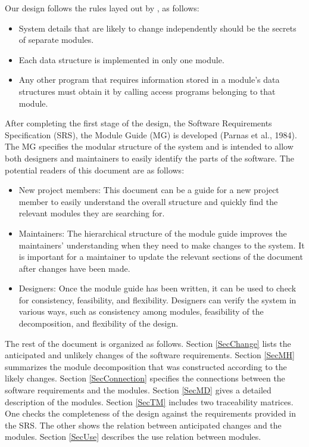 \documentclass[12pt, titlepage]{article}
\begin{document}
Our design follows the rules layed out by \citet{ParnasEtAl1984}, as follows:
\begin{itemize}
\item System details that are likely to change independently should be the
  secrets of separate modules.
\item Each data structure is implemented in only one module.
\item Any other program that requires information stored in a module's data
  structures must obtain it by calling access programs belonging to that module.
\end{itemize}

After completing the first stage of the design, the Software Requirements
Specification (SRS), the Module Guide (MG) is developed (Parnas et al., 1984). The MG specifies the modular structure of the system and is intended to allow both designers and maintainers to easily identify the parts of the software.  The potential readers of this document are as follows:

\begin{itemize}
\item New project members: This document can be a guide for a new project member
  to easily understand the overall structure and quickly find the
  relevant modules they are searching for.
\item Maintainers: The hierarchical structure of the module guide improves the
  maintainers' understanding when they need to make changes to the system. It is
  important for a maintainer to update the relevant sections of the document
  after changes have been made.
\item Designers: Once the module guide has been written, it can be used to
  check for consistency, feasibility, and flexibility. Designers can verify the
  system in various ways, such as consistency among modules, feasibility of the
  decomposition, and flexibility of the design.
\end{itemize}

The rest of the document is organized as follows. Section
\ref{SecChange} lists the anticipated and unlikely changes of the software
requirements. Section \ref{SecMH} summarizes the module decomposition that
was constructed according to the likely changes. Section \ref{SecConnection}
specifies the connections between the software requirements and the
modules. Section \ref{SecMD} gives a detailed description of the
modules. Section \ref{SecTM} includes two traceability matrices. One checks
the completeness of the design against the requirements provided in the SRS. The
other shows the relation between anticipated changes and the modules. Section
\ref{SecUse} describes the use relation between modules.
\end{document}
